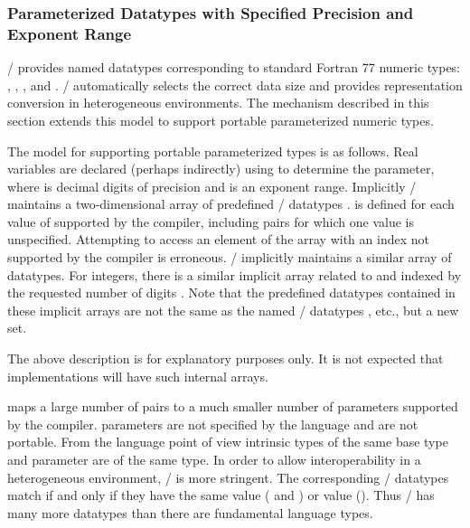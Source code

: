 \subsubsection{Parameterized Datatypes with Specified Precision and Exponent Range}

\MPI/
provides named datatypes corresponding to standard Fortran 77
numeric types: , ,
,  and .
\MPI/ automatically selects the correct data size and provides
representation conversion in heterogeneous environments. The
mechanism described in this section extends this model
to support portable parameterized numeric types.

The model for supporting portable parameterized types is as follows.
Real variables are declared (perhaps indirectly) using
 to determine the  parameter, where
 is decimal digits of precision and  is an exponent range.
Implicitly \MPI/ maintains
a two-dimensional array of predefined \MPI/ datatypes .
 is defined for each value of  supported
by the compiler, including pairs for which one value is unspecified.
Attempting to access an element of the array with an index  not
supported by the compiler is erroneous.
\MPI/ implicitly maintains a similar array of  datatypes.
For integers, there is a similar implicit array related to
 and indexed by
the requested number of digits . Note that the predefined datatypes
contained in these implicit arrays are not the same as the named
\MPI/ datatypes , etc., but a new set.

\begin{implementors}
The above description is for explanatory purposes only. It is not
expected that implementations will have such internal arrays.
\end{implementors}

\begin{users}
 maps a large number of  pairs
to a much smaller number of  parameters supported by the compiler.
 parameters are not specified by the language and are not
portable.  From the language point of view intrinsic types of the
same base type and  parameter are of the same type.
In order to allow interoperability in a heterogeneous environment,
\MPI/ is more stringent. The corresponding \MPI/ datatypes match if
and only if they have the same  value ( and ) or
 value (). Thus \MPI/ has many more datatypes than
there are fundamental language types.
\end{users}

